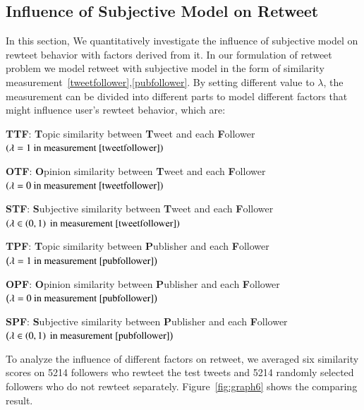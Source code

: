 \documentclass[preprint]{elsarticle}
\begin{document}
\subsection{Influence of Subjective  Model on Retweet}
\label{influence}
In this section, We quantitatively investigate the influence of subjective model on rewteet behavior with factors derived from it. 
In our formulation of retweet problem we model retweet with subjective model in the form of similarity measurement~\ref{tweetfollower},\ref{pubfollower}.
By setting different value to $ \lambda $, the measurement can be divided into different parts to model different factors that might influence user's rewteet behavior, which are:
\begin{itemize*}
\item \textbf{TTF}: \textbf{T}opic similarity between \textbf{T}weet and each \textbf{F}ollower $ \left( \lambda =1  \text{ in measurement~\ref{tweetfollower}} \right) $ 
\item \textbf{OTF}: \textbf{O}pinion similarity between \textbf{T}weet and each \textbf{F}ollower $ \left( \lambda =0 \text{ in measurement~\ref{tweetfollower}} \right) $
\item \textbf{STF}: \textbf{S}ubjective similarity between \textbf{T}weet and each \textbf{F}ollower $ \left( \lambda \in \left( 0,1 \right)   \text{ in measurement~\ref{tweetfollower}} \right) $ 
\item \textbf{TPF}: \textbf{T}opic similarity between \textbf{P}ublisher and each \textbf{F}ollower $ \left( \lambda =1  \text{ in measurement~\ref{pubfollower}}  \right) $ 
\item \textbf{OPF}: \textbf{O}pinion similarity between \textbf{P}ublisher and each \textbf{F}ollower $ \left( \lambda =0 \text{ in measurement~\ref{pubfollower}} \right) $
\item \textbf{SPF}: \textbf{S}ubjective similarity between \textbf{P}ublisher and each \textbf{F}ollower $ \left( \lambda \in \left( 0,1 \right)   \text{ in measurement~\ref{pubfollower}} \right) $
\end{itemize*}
To analyze the influence of different factors on retweet, we averaged six similarity scores on 5214 followers who rewteet the test tweets and 5214 randomly selected followers who do not rewteet separately. 
Figure~\ref{fig:graph6} shows the comparing result.
\end{document}
